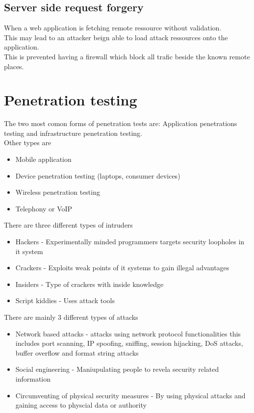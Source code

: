 \documentclass[12pt, a4paper]{article}
\begin{document}
		\subsection{Server side request forgery}
			When a web application is fetching remote ressource without validation.\\
			This may lead to an attacker beign able to load attack ressources onto the application.\\
			This is prevented having a firewall which block all trafic beside the known remote places.\\
	\section{Penetration testing}
		The two most comon forms of penetration tests are:
		Application penetrations testing and infrastructure penetration testing.\\
		Other types are
		\begin{itemize}
			\item Mobile application
			\item Device penetration testing (laptops, consumer devices)
			\item Wireless penetration testing
			\item Telephony or VoIP 
		\end{itemize}
		There are three different types of intruders
		\begin{itemize}
			\item Hackers - Experimentally minded programmers targets security loopholes in it system
			\item Crackers - Exploits weak points of it systems to gain illegal advantages
			\item Insiders - Type of crackers with inside knowledge
			\item Script kiddies - Uses attack tools
		\end{itemize}
		There are mainly 3 different types of attacks
		\begin{itemize}
			\item Network based attacks - attacks using network protocol functionalities this includes port scanning, IP spoofing, sniffing, session hijacking, DoS attacks, buffer overflow and format string attacks
			\item Social engineering - Maniupulating people to revela security related information 
			\item Circumventing of physical security measures - By using physical attacks and gaining access to physcial data or authority
		\end{itemize}
\end{document}
